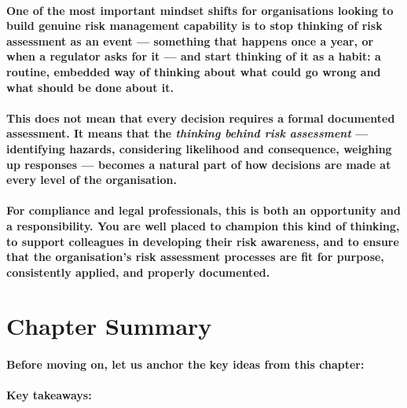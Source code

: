 \paragraph{One of the most important mindset shifts for organisations looking to build genuine risk management capability is to stop thinking of risk assessment as an event — something that happens once a year, or when a regulator asks for it — and start thinking of it as a \textbf{habit}: a routine, embedded way of thinking about what could go wrong and what should be done about it.}

\paragraph{This does not mean that every decision requires a formal documented assessment. It means that the \textbf{\textit{thinking behind risk assessment}} — identifying hazards, considering likelihood and consequence, weighing up responses — becomes a natural part of how decisions are made at every level of the organisation.}

\paragraph{For compliance and legal professionals, this is both an opportunity and a responsibility. You are well placed to champion this kind of thinking, to support colleagues in developing their risk awareness, and to ensure that the organisation's risk assessment processes are fit for purpose, consistently applied, and properly documented.}

\section{Chapter Summary}
\paragraph{Before moving on, let us anchor the key ideas from this chapter:}

\paragraph{Key takeaways:}

